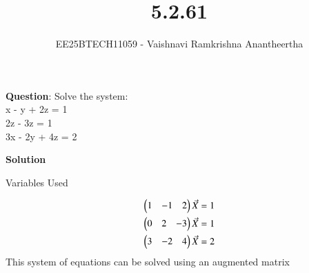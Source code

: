 \documentclass[journal]{IEEEtran}
\title{5.2.61}
\author{EE25BTECH11059 - Vaishnavi Ramkrishna Anantheertha}
\begin{document}
\maketitle

\renewcommand{\thefigure}{\theenumi}
\renewcommand{\thetable}{\theenumi}


\textbf{Question}:
Solve the system:\\
  x - y + 2z = 1 \\
   2z - 3z = 1 \\
  3x - 2y + 4z = 2


\textbf{Solution }
\begin{table}[H]    
  \centering
  
  \caption{Variables Used}
  \label{tab:4.7.56}
\end{table}
\begin{align}
    \begin{pmatrix}1 & -1 & 2\end{pmatrix}\Vec{X}=1\\
     \begin{pmatrix}0 & 2 & -3\end{pmatrix}\Vec{X}=1\\
      \begin{pmatrix}3 & -2 & 4\end{pmatrix}\Vec{X}=2
\end{align}
This system of equations can be solved using an augmented matrix 
\end{document}
